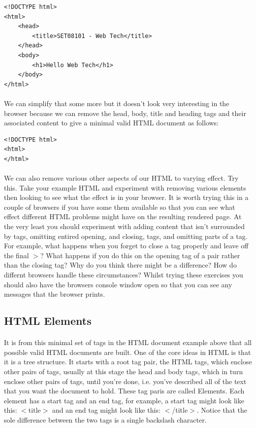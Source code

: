 \documentclass[10pt, a4paper, twosize]{article}
\begin{document}
\begin{lstlisting}
<!DOCTYPE html>
<html>
    <head>
        <title>SET08101 - Web Tech</title>
    </head>
    <body>
        <h1>Hello Web Tech</h1>
    </body>
</html>
\end{lstlisting}

\paragraph{} We can simplify that some more but it doesn't look very interesting in the browser because we can remove the head, body, title and heading tags and their associated content to give a minimal valid HTML document as follows:

\begin{lstlisting}
<!DOCTYPE html>
<html>
</html>
\end{lstlisting}

\paragraph{} We can also remove various other aspects of our HTML to varying effect. Try this. Take your example HTML and experiment with removing various elements then looking to see what the effect is in your browser. It is worth trying this in a couple of browsers if you have some them available so that you can see what effect different HTML problems might have on the resulting rendered page. At the very least you should experiment with adding content that isn't surrounded by tags, omitting entired opening, and closing, tags, and omitting parts of a tag. For example, what happens when you forget to close a tag properly and leave off the final $>$? What happens if you do this on the opening tag of a pair rather than the closing tag? Why do you think there might be a difference? How do differnt browsers handle these circumstances? Whilst trying these exercises you should also have the browsers console window open so that you can see any messages that the browser prints.

\subsection{HTML Elements}
\paragraph{} It is from this minimal set of tags in the HTML document example above that all possible valid HTML documents are built. One of the core ideas in HTML is that it is a tree structure. It starts with a root tag pair, the HTML tags, which enclose other pairs of tags, usually at this stage the head and body tags, which in turn enclose other pairs of tags, until you're done, i.e. you've described all of the text that you want the document to hold. These tag paris are called Elements. Each element has a start tag and an end tag, for example, a start tag might look like this: $<$title$>$ and an end tag might look like this: $<$/title$>$. Notice that the sole difference between the two tags is a single backslash character.
\end{document}
